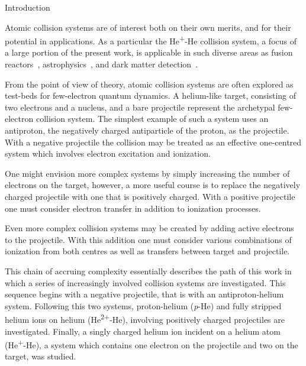 \documentclass[letterpaper, 11 pt]{report}
\begin{document}
\singlespacing

\setcounter{page}{3}

\cleardoublepage
{}
{}
\tableofcontents

\cleardoublepage
{}
{}
\listoftables

\cleardoublepage
{}
{}
\listoffigures

\newpage


\onehalfspacing  %

\begin{chapter}{Introduction \label{chap:intro}}

   Atomic collision systems are of interest both on their own merits, and for their potential in
   applications. As a  particular the He\textsuperscript{+}-He collision system, a focus of a large
   portion of the present work, is applicable in such diverse areas as fusion reactors~\cite{fusion1,
   fusion2}, astrophysics~\cite{astro1, astro2}, and dark matter detection~\cite{dmdet}.

   From the point of view of theory, atomic collision systems are often explored as test-beds for
   few-electron quantum dynamics. A helium-like target, consisting of two electrons and a nucleus, and a
   bare projectile represent the archetypal few-electron collision system. The simplest example of such
   a system uses an antiproton, the negatively charged antiparticle of the proton, as the projectile.
   With a negative projectile the collision may be treated as an effective one-centred system which
   involves electron excitation and ionization.

   One might envision more complex systems by simply increasing the number of electrons on the target,
   however, a more useful course is to replace the negatively charged projectile with one that is
   positively charged. With a positive projectile one must consider electron transfer in addition to
   ionization processes.

   Even more complex collision systems may be created by adding active electrons to the projectile. With
   this addition one must consider various combinations of ionization from both centres as well as
   transfers between target and projectile.

   This chain of accruing complexity essentially describes the path of this work in which a series of
   increasingly involved collision systems are investigated. This sequence begins with a negative
   projectile, that is with an antiproton-helium system. Following this two systems, proton-helium
   (\textit{p}-He) and fully stripped helium ions on helium (He\textsuperscript{2+}-He), involving
   positively charged projectiles are investigated. Finally, a singly charged helium ion incident on
   a helium atom (He\textsuperscript{+}-He), a system which contains one electron on the projectile and
   two on the target, was studied.


\end{chapter}
\end{document}
